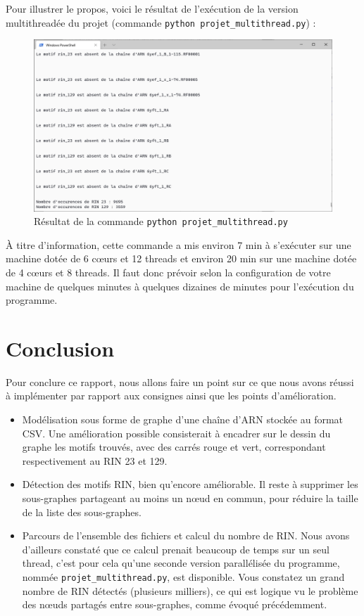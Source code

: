 \documentclass[11pt,a4paper]{article}
\begin{document}
Pour illustrer le propos, voici le résultat de l'exécution de la version multithreadée du projet (commande \texttt{python projet\_multithread.py}) :
\begin{figure}[!h]
\centering \includegraphics[scale=0.6]{screenshot.png}
\caption{Résultat de la commande \texttt{python projet\_multithread.py}}
\end{figure}

À titre d'information, cette commande a mis environ 7 min à s'exécuter sur une machine dotée de 6 cœurs et 12 threads et environ 20 min sur une machine dotée de 4 cœurs et 8 threads. Il faut donc prévoir selon la configuration de votre machine de quelques minutes à quelques dizaines de minutes pour l'exécution du programme.

\section{Conclusion}
Pour conclure ce rapport, nous allons faire un point sur ce que nous avons réussi à implémenter par rapport aux consignes ainsi que les points d'amélioration.\\
\begin{itemize}
\item Modélisation sous forme de graphe d'une chaîne d'ARN stockée au format CSV. Une amélioration possible consisterait à encadrer sur le dessin du graphe les motifs trouvés, avec des carrés rouge et vert, correspondant respectivement au RIN 23 et 129. 
\item Détection des motifs RIN, bien qu'encore améliorable. Il reste à supprimer les sous-graphes partageant au moins un nœud en commun, pour réduire la taille de la liste des sous-graphes.
\item Parcours de l'ensemble des fichiers et calcul du nombre de RIN. Nous avons d'ailleurs constaté que ce calcul prenait beaucoup de temps sur un seul thread, c'est pour cela qu'une seconde version parallélisée du programme, nommée \texttt{projet\_multithread.py}, est disponible. Vous constatez un grand nombre de RIN détectés (plusieurs milliers), ce qui est logique vu le problème des nœuds partagés entre sous-graphes, comme évoqué précédemment.
\end{itemize}
\end{document}

